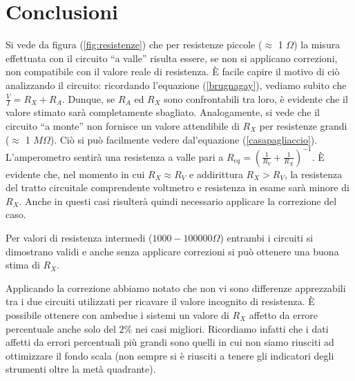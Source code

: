 \section{Conclusioni}
Si vede da figura (\ref{fig:resistenze}) che per resistenze piccole ($\approx$ 1 $\Omega$) la misura effettuata con il circuito ``a valle'' risulta essere, se non si applicano correzioni, non compatibile con il valore reale di resistenza. È facile capire il motivo di ciò analizzando il circuito: ricordando l'equazione (\ref{brugnagay}), vediamo subito che $\frac{V}{I}=R_X+R_A$. Dunque, se $R_A$ ed $R_X$ sono confrontabili tra loro, è evidente che il valore stimato sarà completamente sbagliato. Analogamente, si vede che il circuito ``a monte'' non fornisce un valore attendibile di $R_X$ per resistenze grandi ($\approx$ 1 $M\Omega$). Ciò si può facilmente vedere dal'equazione (\ref{casapagliaccio}). L'amperometro sentirà una resistenza a valle pari a $R_{eq}=(\frac{1}{R_V}+\frac{1}{R_X})^{-1}$. È evidente che, nel momento in cui $R_X \approx R_V$ e addirittura $R_X > R_V$, la resistenza del tratto circuitale comprendente voltmetro e resistenza in esame sarà minore di $R_X$. Anche in questi casi risulterà quindi necessario applicare la correzione del caso. 

Per valori di resistenza intermedi ($1000-100000 \Omega$) entrambi i circuiti si dimostrano validi e anche senza applicare correzioni si può ottenere una buona stima di $R_X$.

Applicando la correzione abbiamo notato che non vi sono differenze apprezzabili tra i due circuiti utilizzati per ricavare il valore incognito di resistenza. È possibile ottenere con ambedue i sistemi un valore di $R_X$ affetto da errore percentuale anche solo del $2\%$ nei casi migliori. Ricordiamo infatti che i dati affetti da errori percentuali più grandi sono quelli in cui non siamo riusciti ad ottimizzare il fondo scala (non sempre si è riusciti a tenere gli indicatori degli strumenti oltre la metà quadrante). %



